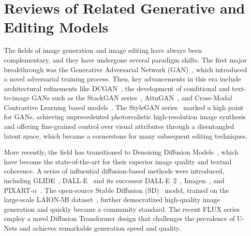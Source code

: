 \documentclass{article} %
\begin{document}
\section{Reviews of Related Generative and Editing Models}
\label{supp:related}
The fields of image generation and image editing have always been complementary, and they have undergone several paradigm shifts. The first major breakthrough was the Generative Adversarial Network (GAN)~\citep{gan}, which introduced a novel adversarial training process. Then, key advancements in this era include architectural refinements like DCGAN~\citep{dcgan}, the development of conditional and text-to-image GANs such as the StackGAN series~\citep{zhang2017stackgan, zhang2018stackgan++}, AttnGAN~\citep{xu2018attngan}, and Cross-Modal Contrastive Learning based models~\citep{zhang2021cross}. The StyleGAN series~\citep{StyleGAN1, StyleGAN2, StyleGAN3} marked a high point for GANs, achieving unprecedented photorealistic high-resolution image synthesis and offering fine-grained control over visual attributes through a disentangled latent space, which became a cornerstone for many subsequent editing techniques.

More recently, the field has transitioned to Denoising Diffusion Models~\citep{ho2020denoising}, which have become the state-of-the-art for their superior image quality and textual coherence. A series of influential diffusion-based methods were introduced, including GLIDE~\citep{nichol2021glide}, DALL$\cdot$E~\citep{dalle} and its successor DALL$\cdot$E~2~\citep{unclip}, Imagen~\citep{imagen}, and PIXART-$\alpha$~\citep{pixart}. The open-source Stable Diffusion (SD)~\citep{sd} model, trained on the large-scale LAION-5B dataset~\citep{schuhmann2022laion}, further democratized high-quality image generation and quickly became a community standard. The recent FLUX series~\citep{flux} employ a novel Diffusion Transformer design that challenges the prevalence of U-Nets and achieves remarkable generation speed and quality.
\end{document}
